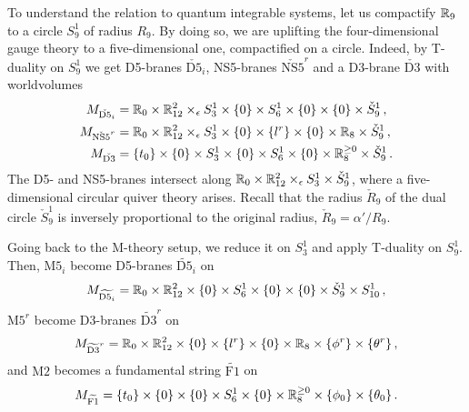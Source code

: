 To understand the relation to quantum integrable systems, let us
compactify $\mathbb{R}_9$ to a circle $S^1_9$ of radius $R_9$.  By doing so,
we are uplifting the four-dimensional gauge theory to a
five-dimensional one, compactified on a circle.  Indeed, by T-duality
on $S^1_9$ we get D5-branes $\check{\mathrm{D5}}_i$, NS5-branes
$\check{\mathrm{NS5}}^r$ and a D3-brane $\check{\mathrm{D3}}$ with
worldvolumes
\begin{align}
  \label{eq:M-D5}
  M_{\check{\mathrm{D5}}_i}
  &=
  \mathbb{R}_0 \times \mathbb{R}^2_{12} \times_\epsilon S^1_3 \times \{0\}
  \times S^1_6 \times \{0\} \times \{0\} \times \check S^1_9 \,,
  \\
  \label{eq:M-NS5}
  M_{\check{\mathrm{NS5}}^r}
  &=
  \mathbb{R}_0 \times \mathbb{R}^2_{12} \times_\epsilon S^1_3 \times \{0\}
  \times \{l^r\} \times \{0\} \times \mathbb{R}_8 \times \check S^1_9 \,,
  \\
  \label{eq:M-D3}
  M_{\check{\mathrm{D3}}}
  &=
  \{t_0\} \times \{0\} \times S^1_3 \times \{0\}
  \times S^1_6 \times \{0\} \times \mathbb{R}^{\geq0}_8
  \times \check S^1_9 \,.
\end{align}
The D5- and NS5-branes intersect along
$\mathbb{R}_0 \times \mathbb{R}^2_{12} \times_\epsilon S^1_3 \times \check S^1_9$, where a
five-dimensional circular quiver theory arises.  Recall that the
radius $\check{R}_9$ of the dual circle $\check{S}^1_9$ is inversely
proportional to the original radius, $\check{R}_9 = \alpha'/R_9$.

Going back to the M-theory setup, we reduce it on $S^1_3$ and apply
T-duality on $S^1_9$.  Then, $\mathrm{M5}_i$ become D5-branes
$\widetilde{\mathrm{D5}}_i$ on
\begin{equation}
  M_{\widetilde{\mathrm{D5}_i}}
  =
  \mathbb{R}_0 \times \mathbb{R}^2_{12} \times \{0\} \times S^1_6
  \times \{0\} \times \{0\} \times \check{S}^1_9 \times S^1_{10} \,,
\end{equation}
$\mathrm{M5}^r$ become D3-branes $\widetilde{\mathrm{D3}}^r$ on
\begin{equation}
  M_{\widetilde{\mathrm{D3}}^r}
  =
  \mathbb{R}_0 \times \mathbb{R}^2_{12} \times \{0\} \times \{l^r\}
  \times \{0\} \times \mathbb{R}_8 \times \{\phi^r\} \times \{\theta^r\} \,,
\end{equation}
and $\mathrm{M2}$ becomes a fundamental string $\widetilde{\mathrm{F1}}$ on
\begin{equation}
  M_{\widetilde{\mathrm{F1}}}
  =
  \{t_0\} \times \{0\} \times \{0\}
  \times S^1_6 \times \{0\} \times \mathbb{R}^{\geq0}_8
  \times \{\phi_0\} \times \{\theta_0\} \,.
\end{equation}





